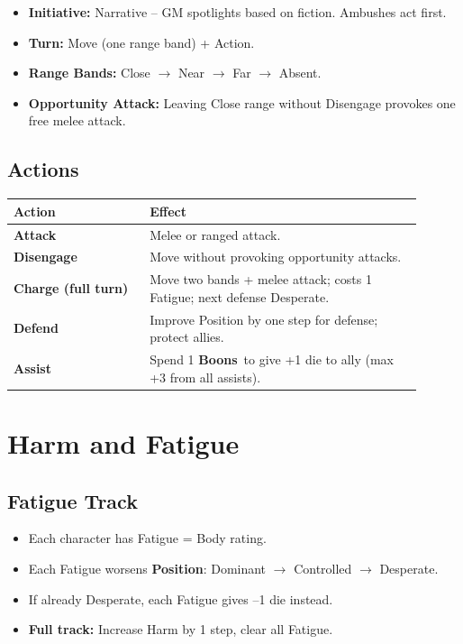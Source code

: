 \documentclass[10pt,twocolumn]{article}
\newcommand{\gameterm}[1]{\textbf{#1}\index{#1}}
\newcommand{\boons}{\gameterm{Boons}}
\newcommand{\position}{\gameterm{Position}}
\begin{document}
\begin{itemize}
    \item \textbf{Initiative:} Narrative -- GM spotlights based on fiction. Ambushes act first.
    \item \textbf{Turn:} Move (one range band) + Action.
    \item \textbf{Range Bands:} Close $\rightarrow$ Near $\rightarrow$ Far $\rightarrow$ Absent.
    \item \textbf{Opportunity Attack:} Leaving Close range without Disengage provokes one free melee attack.
\end{itemize}

\subsection{Actions}
\begin{coretable}
\begin{tabular}{>{\bfseries}p{0.3\linewidth} p{0.6\linewidth}}
\toprule
\textbf{Action} & \textbf{Effect} \\
\midrule
Attack & Melee or ranged attack. \\
Disengage & Move without provoking opportunity attacks. \\
Charge (full turn) & Move two bands + melee attack; costs 1 Fatigue; next defense Desperate. \\
Defend & Improve Position by one step for defense; protect allies. \\
Assist & Spend 1 \boons\ to give +1 die to ally (max +3 from all assists). \\
\bottomrule
\end{tabular}
\end{coretable}

\section{Harm and Fatigue}

\subsection{Fatigue Track}
\begin{itemize}
    \item Each character has Fatigue = Body rating.
    \item Each Fatigue worsens \position: Dominant $\rightarrow$ Controlled $\rightarrow$ Desperate.
    \item If already Desperate, each Fatigue gives --1 die instead.
    \item \textbf{Full track:} Increase Harm by 1 step, clear all Fatigue.
\end{itemize}
\end{document}
